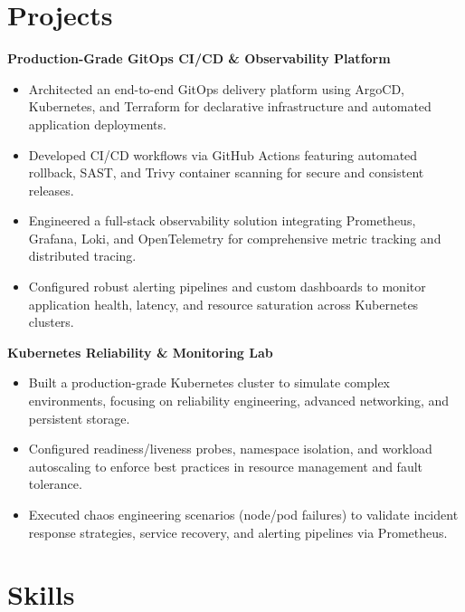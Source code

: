\documentclass[11pt, letterpaper]{article}
\begin{document}
\section*{Projects}

\vspace{2pt}
\textbf{Production-Grade GitOps CI/CD \& Observability Platform}
\begin{itemize}
    \item Architected an end-to-end GitOps delivery platform using ArgoCD, Kubernetes, and Terraform for declarative infrastructure and automated application deployments.
    \item Developed CI/CD workflows via GitHub Actions featuring automated rollback, SAST, and Trivy container scanning for secure and consistent releases.
    \item Engineered a full-stack observability solution integrating Prometheus, Grafana, Loki, and OpenTelemetry for comprehensive metric tracking and distributed tracing.
    \item Configured robust alerting pipelines and custom dashboards to monitor application health, latency, and resource saturation across Kubernetes clusters.
\end{itemize}

\vspace{4pt}
\textbf{Kubernetes Reliability \& Monitoring Lab}
\begin{itemize}
    \item Built a production-grade Kubernetes cluster to simulate complex environments, focusing on reliability engineering, advanced networking, and persistent storage.
    \item Configured readiness/liveness probes, namespace isolation, and workload autoscaling to enforce best practices in resource management and fault tolerance.
    \item Executed chaos engineering scenarios (node/pod failures) to validate incident response strategies, service recovery, and alerting pipelines via Prometheus.
\end{itemize}

\section*{Skills}
\end{document}
